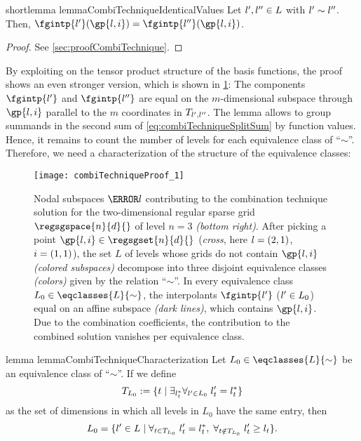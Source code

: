 \begin{restatable}{%
  shortlemma%
}{%
  lemmaCombiTechniqueIdenticalValues%
}
  \label{lemma:combiTechniqueIdenticalValues}
  Let $\*l', \*l'' \in L$ with $\*l' \sim \*l''$.
  Then, $\fgintp{\*l'}(\gp{\*l,\*i})
  = \fgintp{\*l''}(\gp{\*l,\*i})$.
\end{restatable}

\begin{proof}
  See \cref{sec:proofCombiTechnique}.
\end{proof}

By exploiting on the tensor product structure of the basis functions,
the proof shows an even stronger version, which is shown
in \cref{fig:combiTechniqueProof}:
The components $\fgintp{\*l'}$ and $\fgintp{\*l''}$ are equal
on the $m$-dimensional subspace through $\gp{\*l,\*i}$
parallel to the $m$ coordinates in $T_{\*l',\*l''}$.
The lemma allows to group summands in the second sum of
\eqref{eq:combiTechniqueSplitSum} by function values.
Hence, it remains to count the number of levels for
each equivalence class of ``$\sim$''.
Therefore, we need a characterization of the structure
of the equivalence classes:

\begin{SCfigure}
  \texttt{[image: combiTechniqueProof\_1]}%
  \caption[%
    Canceling out function values in the proof of the combination technique%
  ]{%
    Nodal subspaces $\ns{\*l}$ contributing to the combination
    technique solution for the two-dimensional regular sparse grid
    $\regsgspace{n}{d}{}$ of level $n = 3$ \emph{(bottom right)}.
    After picking a point $\gp{\*l,\*i} \in \regsgset{n}{d}{}$
    (\emph{cross}, here $\*l = (2, 1)$, $\*i = (1, 1)$),
    the set $L$ of levels whose grids do not contain $\gp{\*l,\*i}$
    \emph{(colored subspaces)}
    decompose into three disjoint equivalence classes
    \emph{(colors)} given by the relation ``$\sim$''.
    In every equivalence class $L_0 \in \eqclasses{L}{\sim}$,
    the interpolants $\fgintp{\*l'}$ ($\*l' \in L_0$)
    equal on an affine subspace
    \emph{(dark lines)}, which contains $\gp{\*l,\*i}$.
    Due to the combination coefficients,
    the contribution to the combined solution
    vanishes per equivalence class.%
  }%
  \label{fig:combiTechniqueProof}%
\end{SCfigure}

\begin{restatable}{%
  lemma%
}{%
  lemmaCombiTechniqueCharacterization%
}
  \label{lemma:combiTechniqueCharacterization}
  Let $L_0 \in \eqclasses{L}{\sim}$ be an equivalence class of ``$\sim$''.
  If we define
  \begin{equation}
    T_{L_0}
    := \{t \mid \exfa{l^\ast_t}{\*l' \in L_0}{l'_t = l^\ast_t}\}
  \end{equation}
  as the set of dimensions in which all levels in $L_0$
  have the same entry, then
  \begin{equation}
    L_0
    = \{\*l' \in L \mid
    \fa{t \in T_{L_0}}{l'_t = l^\ast_t},\;
    \fa{t \notin T_{L_0}}{l'_t \ge l_t}\}.
  \end{equation}
\end{restatable}

